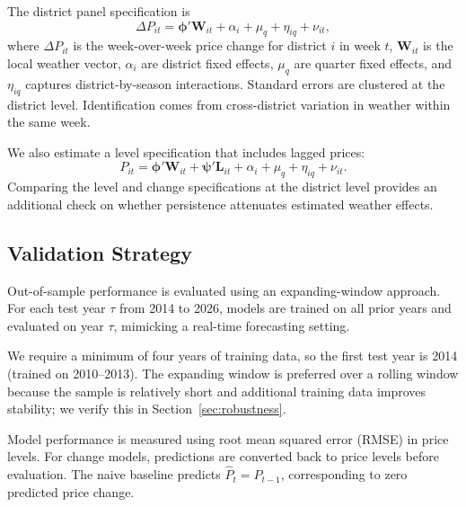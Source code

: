 \documentclass[12pt]{article}
\begin{document}
The district panel specification is
\begin{equation}
\label{eq:district_change}
\Delta P_{it} = \boldsymbol{\phi}' \mathbf{W}_{it} + \alpha_i + \mu_q + \eta_{iq} + \nu_{it},
\end{equation}
where $\Delta P_{it}$ is the week-over-week price change for district $i$ in week $t$, $\mathbf{W}_{it}$ is the local weather vector, $\alpha_i$ are district fixed effects, $\mu_q$ are quarter fixed effects, and $\eta_{iq}$ captures district-by-season interactions. Standard errors are clustered at the district level. Identification comes from cross-district variation in weather within the same week.

We also estimate a level specification that includes lagged prices:
\begin{equation}
\label{eq:district_level}
P_{it} = \boldsymbol{\phi}' \mathbf{W}_{it} + \boldsymbol{\psi}' \mathbf{L}_{it} + \alpha_i + \mu_q + \eta_{iq} + \nu_{it}.
\end{equation}
Comparing the level and change specifications at the district level provides an additional check on whether persistence attenuates estimated weather effects.

\subsection{Validation Strategy}
\label{subsec:validation}

Out-of-sample performance is evaluated using an expanding-window approach. For each test year $\tau$ from 2014 to 2026, models are trained on all prior years and evaluated on year $\tau$, mimicking a real-time forecasting setting.

We require a minimum of four years of training data, so the first test year is 2014 (trained on 2010--2013). The expanding window is preferred over a rolling window because the sample is relatively short and additional training data improves stability; we verify this in Section~\ref{sec:robustness}.

Model performance is measured using root mean squared error (RMSE) in price levels. For change models, predictions are converted back to price levels before evaluation. The naive baseline predicts $\hat{P}_t = P_{t-1}$, corresponding to zero predicted price change.

\end{document}
